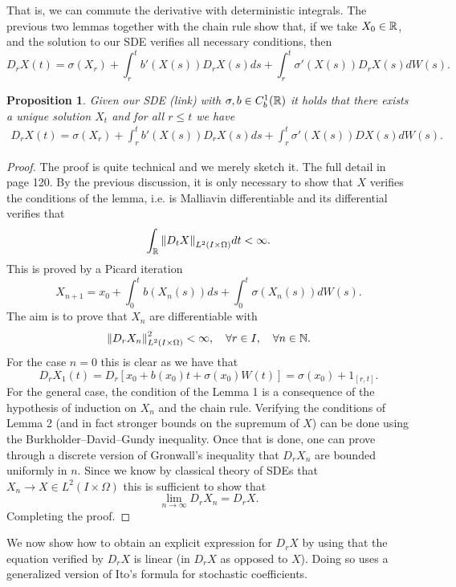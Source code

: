 \documentclass[12pt]{article}
\newtheorem{proposition}{Proposition}
\begin{document}
That is, we can commute the derivative with deterministic integrals. The previous two lemmas together with the chain rule show that, if we take $X_0\in {\mathbb R}$, and the solution to our SDE verifies all necessary conditions, then
\begin{equation*}
	D_rX(t)=\sigma(X_r)+\int_{r}^tb'(X(s))D_rX(s) ds+\int_{r}^t \sigma'(X(s))D_rX(s) dW(s) .
\end{equation*}
\begin{proposition}
	Given our SDE (link) with $\sigma ,b\in C^1_b({\mathbb R})$ it holds that there exists a unique solution $X_t$ and for all $r\leq t$ we have
	\begin{multline*}
		D_rX(t)=\sigma(X_r)+\int_{r}^tb'(X(s))D_rX(s) ds+\int_{r}^t \sigma'(X(s))DX(s) dW(s) .
	\end{multline*}
\end{proposition}
\begin{proof}
	The proof is quite technical and we merely sketch it. The full detail in \cite{nunno2008malliavin} page 120.    By the previous discussion, it is only necessary to show that $X$ verifies the conditions of the lemma, i.e. is Malliavin differentiable and its differential verifies that
	\begin{equation*}
		\int_{{\mathbb R}}\norm{D_tX}_{L^2(I\times\Omega)} d t<\infty.
	\end{equation*}
	This is proved by a Picard iteration
	\begin{equation*}
		X_{n+1}=x_0+\int_{0}^t b(X_n(s)) ds+\int_{0}^t\sigma (X_n(s)) dW(s).
	\end{equation*}
	The aim is to prove that $X_n$ are differentiable with
	\begin{equation*}
		\norm{D_rX_n}_{L^2(I\times\Omega)}^2<\infty , \quad\forall r\in I, \quad\forall n\in \mathbb{N}.
	\end{equation*}
	For the case $n=0$ this is clear as we have that
	\begin{equation*}
		D_rX_1(t)=D_r[x_0+b(x_0)t+\sigma (x_0) W(t)]=\sigma(x_0)+1_{[r,t]}.
	\end{equation*}
	For the general case, the condition of the Lemma 1 is a consequence of the hypothesis of induction on $X_n$ and the chain rule.  Verifying the conditions of Lemma 2 (and in fact stronger bounds on the supremum of $X$) can be done using the Burkholder–David–Gundy inequality. Once that is done, one can prove through a discrete version of Gronwall's inequality that $D_rX_n$ are bounded uniformly in  $n$. Since we know by classical theory of SDEs that $X_n\to X\in L^2(I\times\Omega)$ this is sufficient to show that	\begin{equation*}
		\lim_{n \to \infty}D_rX_n=D_rX.
	\end{equation*}
	Completing the proof.
\end{proof}
We now show how to obtain an explicit expression for $D_rX$ by using that the equation verified by  $D_rX$ is linear (in  $D_rX$ as opposed to $X$). Doing so uses a generalized version of Ito's formula for stochastic coefficients.
\end{document}
